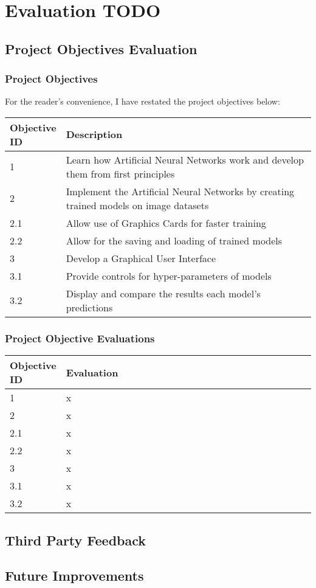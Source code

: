 \documentclass[./project-report/src/latex/project-report.tex]{subfiles}
\begin{document}
\maketitle

\section{Evaluation TODO}

\subsection{Project Objectives Evaluation}

\subsubsection{Project Objectives}

For the reader's convenience, I have restated the project objectives below:
\vspace{5mm}

\noindent\begin{tabular}{|p{0.13\linewidth}|p{0.87\linewidth}|}
    \hline
    \textbf{Objective ID} & \textbf{Description} \\
    \hline
    1 & Learn how Artificial Neural Networks work and develop them from first principles \\
    \hline
    2 & Implement the Artificial Neural Networks by creating trained models on image datasets \\
    \hline
    2.1 & Allow use of Graphics Cards for faster training \\
    \hline
    2.2 & Allow for the saving and loading of trained models \\
    \hline
    3 & Develop a Graphical User Interface \\
    \hline
    3.1 & Provide controls for hyper-parameters of models \\
    \hline
    3.2 & Display and compare the results each model's predictions \\
    \hline
\end{tabular}

\subsubsection{Project Objective Evaluations}

\begin{tabular}{|p{0.13\linewidth}|p{0.87\linewidth}|}
    \hline
    \textbf{Objective ID} & \textbf{Evaluation} \\
    \hline
    1 & x \\
    \hline
    2 & x \\
    \hline
    2.1 & x \\
    \hline
    2.2 & x \\
    \hline
    3 & x \\
    \hline
    3.1 & x \\
    \hline
    3.2 & x \\
    \hline
\end{tabular}

\subsection{Third Party Feedback}

\subsection{Future Improvements}
\end{document}
